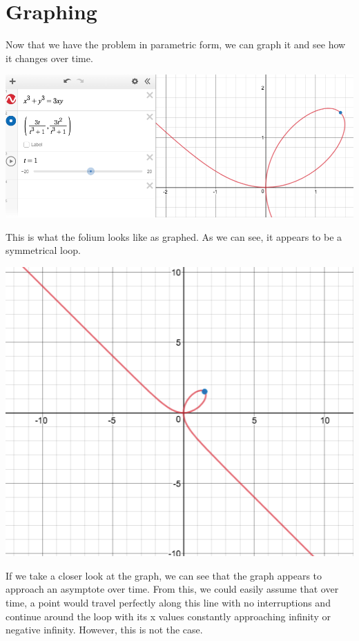 \documentclass[a4paper,openright, 10pt]{article}
\begin{document}
\section*{Graphing}
Now that we have the problem in parametric form, we can graph it and see how it changes over time.
\begin{center}
    \includegraphics[scale=0.5]{graph}
\end{center}
This is what the folium looks like as graphed. As we can see, it appears to be a symmetrical loop. 
\begin{center}
    \includegraphics[scale=0.5]{graph1}
\end{center}
If we take a closer look at the graph, we can see that the graph appears to approach an asymptote over time. From this, we could easily assume that over time, a point would travel perfectly along this line with no interruptions and continue around the loop with its x values constantly approaching infinity or negative infinity. However, this is not the case.
\end{document}
